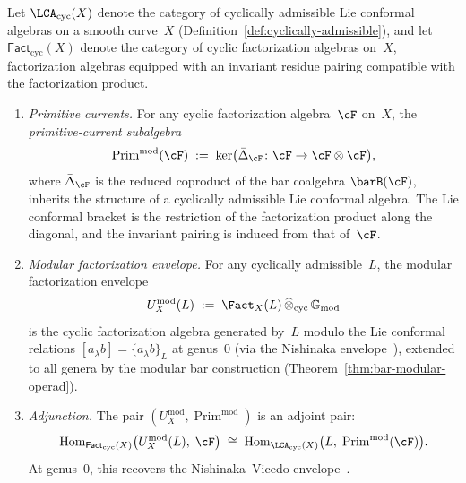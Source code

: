 \begin{theorem}
\label{thm:platonic-adjunction}
\ClaimStatusProvedHere
{}
Let $\LCA_{\mathrm{cyc}}(X)$ denote the category of cyclically
admissible Lie conformal algebras on a smooth curve~$X$
(Definition~\textup{\ref{def:cyclically-admissible}}), and let
$\mathsf{Fact}_{\mathrm{cyc}}(X)$ denote the category of cyclic
factorization algebras on~$X$, factorization algebras
equipped with an invariant residue pairing compatible with
the factorization product.
\begin{enumerate}[label=\textup{(\roman*)}]
\item \emph{Primitive currents.}  For any cyclic factorization
  algebra~$\cF$ on~$X$, the \emph{primitive-current
  subalgebra}
  \[
  \operatorname{Prim}^{\mathrm{mod}}(\cF)
  \;:=\;
  \ker\bigl(\bar\Delta_{\cF}\colon
  \cF \to \cF \otimes \cF\bigr),
  \]
  where $\bar\Delta_{\cF}$ is the reduced coproduct of the bar
  coalgebra $\barB(\cF)$, inherits the structure of a
  cyclically admissible Lie conformal algebra.  The Lie
  conformal bracket is the restriction of the factorization
  product along the diagonal, and the invariant pairing is
  induced from that of~$\cF$.
\item \emph{Modular factorization envelope.}  For any
  cyclically admissible~$L$, the modular factorization
  envelope
  \[
  U_X^{\mathrm{mod}}(L)
  \;:=\;
  \Fact_X(L) \,\widehat\otimes_{\mathrm{cyc}}\,
  \mathbb{G}_{\mathrm{mod}}
  \]
  is the cyclic factorization algebra generated by~$L$ modulo
  the Lie conformal relations $[a_\lambda b] = \{a_\lambda b\}_L$
  at genus~$0$ (via the Nishinaka envelope~\cite{Nish26}),
  extended to all genera by the modular bar construction
  (Theorem~\textup{\ref{thm:bar-modular-operad}}).
\item \emph{Adjunction.}  The pair
  $(U_X^{\mathrm{mod}}, \operatorname{Prim}^{\mathrm{mod}})$
  is an adjoint pair:
  \begin{equation}\label{eq:platonic-adjunction}
  \operatorname{Hom}_{\mathsf{Fact}_{\mathrm{cyc}}(X)}
    \bigl(U_X^{\mathrm{mod}}(L),\; \cF\bigr)
  \;\cong\;
  \operatorname{Hom}_{\LCA_{\mathrm{cyc}}(X)}
    \bigl(L,\;
    \operatorname{Prim}^{\mathrm{mod}}(\cF)\bigr).
  \end{equation}
  At genus~$0$, this recovers the Nishinaka--Vicedo
  envelope~\cite{Nish26,Vic25}.
\end{enumerate}
\end{theorem}


